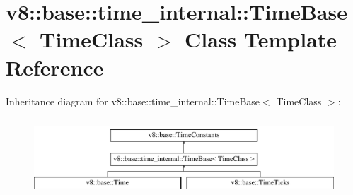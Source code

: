 \hypertarget{classv8_1_1base_1_1time__internal_1_1TimeBase}{}\section{v8\+:\+:base\+:\+:time\+\_\+internal\+:\+:Time\+Base$<$ Time\+Class $>$ Class Template Reference}
\label{classv8_1_1base_1_1time__internal_1_1TimeBase}
Inheritance diagram for v8\+:\+:base\+:\+:time\+\_\+internal\+:\+:Time\+Base$<$ Time\+Class $>$\+:\begin{figure}[H]
\begin{center}
\leavevmode
\includegraphics[height=2.947368cm]{classv8_1_1base_1_1time__internal_1_1TimeBase}
\end{center}
\end{figure}
